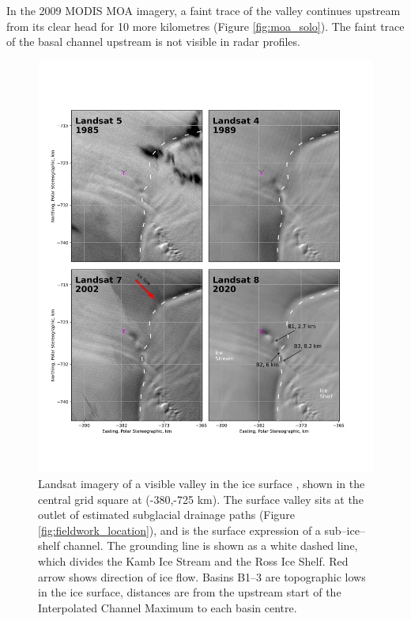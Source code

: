 In the 2009 MODIS MOA imagery, a faint trace of the valley continues upstream from its clear head for 10 more kilometres (Figure \ref{fig:moa_solo}). The faint trace of the basal channel upstream is not visible in radar profiles. 

\begin{figure}[!ht]
\centering
\includegraphics[width=1\textwidth]{chapters/2/historic_channel.png}
\caption[Historic Landsat imagery]{Landsat imagery of a visible valley in the ice surface \citep{RoyLandsat8Scienceproduct2014}, shown in the central grid square at (-380,-725 km). The surface valley sits at the outlet of estimated subglacial drainage paths (Figure \ref{fig:fieldwork_location}), and is the surface expression of a sub--ice--shelf channel. The grounding line \citep{depoorter2013calving} is shown as a white dashed line, which divides the Kamb Ice Stream and the Ross Ice Shelf. Red arrow shows direction of ice flow. Basins B1--3 are topographic lows in the ice surface, distances are  from the upstream start of the Interpolated Channel Maximum to each basin centre.}
\label{fig:historic}
\end{figure}




